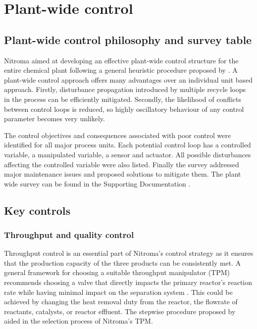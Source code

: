 \section{Plant-wide control}
\label{sec:PWS}

\subsection{Plant-wide control philosophy and survey table} %

Nitroma aimed at developing an effective plant-wide control structure for the entire chemical plant following a general heuristic procedure proposed by \textcite{luyben_plantwide_1997}. A plant-wide control approach offers many advantages over an individual unit based approach. Firstly, disturbance propagation introduced by multiple recycle loops in the process can be efficiently mitigated. Secondly, the likelihood of conflicts between control loops is reduced, so highly oscillatory behaviour of any control parameter becomes very unlikely. 

The control objectives and consequences associated with poor control were identified for all major process units. Each potential control loop has a controlled variable, a manipulated variable, a sensor and actuator. All possible disturbances affecting the controlled variable were also listed. Finally the survey addressed major maintenance issues and proposed solutions to mitigate them. The plant wide survey can be found in the Supporting Documentation .


\subsection{Key controls}

\subsubsection{Throughput and quality control} %

Throughput control is an essential part of Nitroma's control strategy as it ensures that the production capacity of the three products can be consistently met. A general framework for choosing a suitable throughput manipulator (TPM) recommends choosing a valve that directly impacts the primary reactor's reaction rate while having minimal impact on the separation system \cite{luyben_plantwide_1997}. This could be achieved by changing the heat removal duty from the reactor, the flowrate of reactants, catalysts, or reactor effluent. The stepwise procedure proposed by \textcite{price_throughput_1994} aided in the selection process of Nitroma's TPM. 

